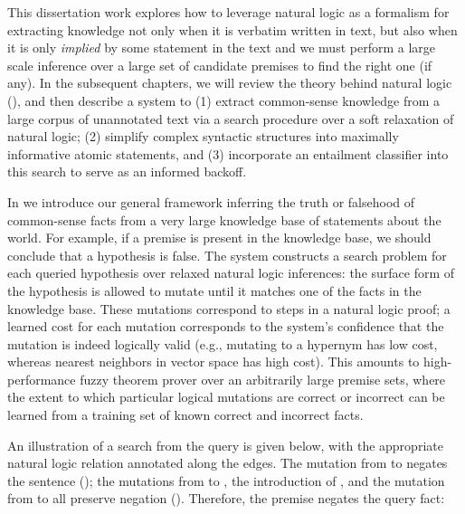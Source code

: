 This dissertation work explores how to leverage natural logic as a formalism for
  extracting knowledge not only when it is verbatim written in text, but also when
  it is only \textit{implied} by some statement in the text and we must perform
  a large scale inference over a large set of candidate premises to find the right one
  (if any).
In the subsequent chapters, we will review the theory behind natural logic
  (), and then describe a system to
  (1) extract common-sense knowledge from a large corpus of unannotated text via 
    a search procedure over a soft relaxation of natural logic;
  (2) simplify complex syntactic structures into maximally informative atomic
    statements, and
  (3) incorporate an entailment classifier into this search to serve as an
    informed backoff.


%
%

In  we introduce our general framework inferring the truth or 
  falsehood of common-sense facts from a very large knowledge base 
  of statements about the world.
For example, if a premise  is present in the knowledge 
  base, we should conclude that a hypothesis  is false.
The system constructs a search problem for each queried hypothesis over relaxed 
  natural logic inferences: the surface form of the hypothesis is allowed to mutate 
  until it matches one of the facts in the knowledge base.
These mutations correspond to steps in a natural logic proof; a learned cost for each 
  mutation corresponds to the system's confidence that the mutation is indeed 
  logically valid (e.g., mutating to a hypernym has low cost, whereas 
  nearest neighbors in vector space has high cost).
This amounts to high-performance fuzzy theorem prover over an arbitrarily 
  large premise sets, where the extent to which particular logical mutations
  are correct or incorrect can be learned from a training set of known correct
  and incorrect facts.


An illustration of a search from the query  
  is given below, with the appropriate natural logic relation annotated 
  along the edges.
The mutation from  to  negates the sentence (\negate); the mutations
  from  to , the introduction of , and the mutation from
   to  all preserve negation (\reverse).
Therefore, the premise negates the query fact:


\vspace{1cm}
\begin{center}
\teaserSearch
\end{center}
\vspace{1cm}


